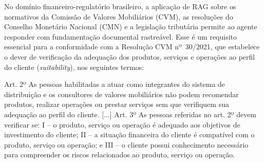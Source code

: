 No domínio financeiro-regulatório brasileiro, a aplicação de RAG sobre os
normativos da Comissão de Valores Mobiliários (CVM), as resoluções do Conselho
Monetário Nacional (CMN) e a legislação tributária permite ao agente responder
com fundamentação documental rastreável. Esse é um requisito essencial para a
conformidade com a Resolução CVM nº~30/2021, que estabelece o dever de
verificação da adequação dos produtos, serviços e operações ao perfil do
cliente (\textit{suitability}), nos seguintes termos:

\begin{citacao}
Art. 2º As pessoas habilitadas a atuar como integrantes do sistema de
distribuição e os consultores de valores mobiliários não podem recomendar
produtos, realizar operações ou prestar serviços sem que verifiquem sua
adequação ao perfil do cliente. [...] Art. 3º As pessoas referidas no art. 2º
devem verificar se: I – o produto, serviço ou operação é adequado aos
objetivos de investimento do cliente; II – a situação financeira do cliente é
compatível com o produto, serviço ou operação; e III – o cliente possui
conhecimento necessário para compreender os riscos relacionados ao produto,
serviço ou operação. \parencite[p.~1]{resolucaocvm30}
\end{citacao}
